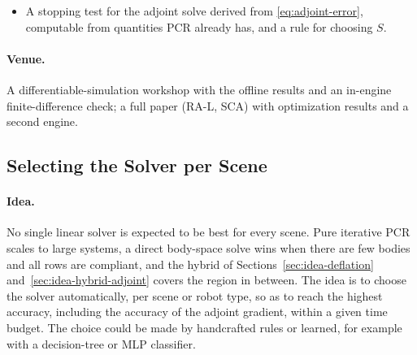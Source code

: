 \begin{itemize}
    $\mathbf{A}_{SS} = \mathbf{J}_S\tilde{\mathbf{M}}^{-1}\mathbf{J}_S^\top + \mathbf{C}_S$
    only if they act on a common body. For a chain, $\mathbf{A}_{SS}$ is
    therefore block tridiagonal, and a banded Cholesky factorization costs
    $O(k)$. For a kinematic tree, the joints at one body form a small dense
    block, and the blocks are linked as the tree is. Eliminating them from
    the leaves toward the root costs $O(k)$ as long as every body has a
    bounded number of children. The underlying result is linear-time
    articulated dynamics: \citet{baraff1996linear} orders the combined
    system of bodies and constraints, whose graph is a tree, so that the
    factorization has no fill-in at all. Factoring that combined system is
    an alternative to factoring $\mathbf{A}_{SS}$ directly. Both would keep the elimination, the forward
    refactor and the backward refactor cheap for large robots. The test
    scripts use a dense factorization.
  \item A stopping test for the adjoint solve derived from
    \eqref{eq:adjoint-error}, computable from quantities PCR already has,
    and a rule for choosing $S$.
\end{itemize}

\paragraph{Venue.}
A differentiable-simulation workshop with the offline results and an
in-engine finite-difference check; a full paper (RA-L, SCA) with
optimization results and a second engine.

\clearpage
\subsection{Selecting the Solver per Scene}
\label{sec:idea-solver-selection}

\paragraph{Idea.}
No single linear solver is expected to be best for every scene. Pure
iterative PCR scales to large systems, a direct body-space solve wins when
there are few bodies and all rows are compliant, and the hybrid of
Sections~\ref{sec:idea-deflation} and~\ref{sec:idea-hybrid-adjoint} covers
the region in between. The idea is to choose the solver automatically,
per scene or robot type, so as to reach the highest accuracy, including
the accuracy of the adjoint gradient, within a given time budget. The
choice could be made by handcrafted rules or learned, for example with a
decision-tree or MLP classifier.

